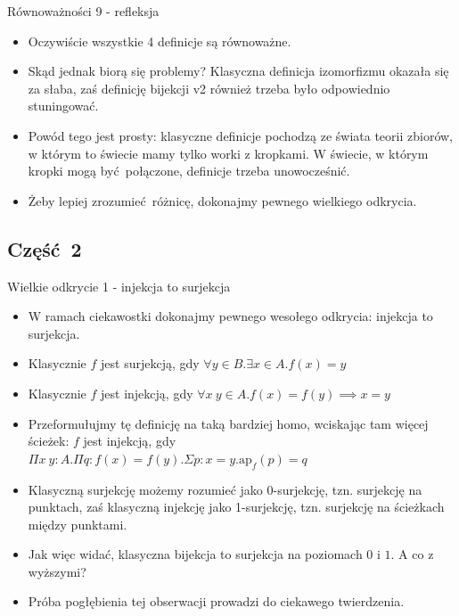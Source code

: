 \documentclass{beamer}
\newcommand{\ap}[2]{\text{ap}_{#1}(#2)}
\begin{document}
\begin{frame}{Równoważności 9 - refleksja}
\begin{itemize}
	\item Oczywiście wszystkie 4 definicje są równoważne.
	\item Skąd jednak biorą się problemy? Klasyczna definicja izomorfizmu okazała się za słaba, zaś definicję bijekcji v2 również trzeba było odpowiednio stuningować.
	\item Powód tego jest prosty: klasyczne definicje pochodzą ze świata teorii zbiorów, w którym to świecie mamy tylko worki z kropkami. W świecie, w którym kropki mogą być połączone, definicje trzeba unowocześnić.
	\item Żeby lepiej zrozumieć różnicę, dokonajmy pewnego wielkiego odkrycia.
\end{itemize}
\end{frame}

\subsection{Część 2}

\begin{frame}{Wielkie odkrycie 1 - injekcja to surjekcja}
\begin{itemize}
	\item W ramach ciekawostki dokonajmy pewnego wesołego odkrycia: injekcja to surjekcja.
	\item Klasycznie $f$ jest surjekcją, gdy $\forall y \in B. \exists x \in A. f(x) = y$
	\item Klasycznie $f$ jest injekcją, gdy $\forall x\ y \in A. f(x) = f(y) \implies x = y$
	\item Przeformułujmy tę definicję na taką bardziej homo, wciskając tam więcej ścieżek: $f$ jest injekcją, gdy $\Pi x\ y : A. \Pi q : f(x) = f(y). \Sigma p : x = y. \ap{f}{p} = q$
	\item Klasyczną surjekcję możemy rozumieć jako 0-surjekcję, tzn. surjekcję na punktach, zaś klasyczną injekcję jako 1-surjekcję, tzn. surjekcję na ścieżkach między punktami.
	\item Jak więc widać, klasyczna bijekcja to surjekcja na poziomach $0$ i $1$. A co z wyższymi?
	\item Próba pogłębienia tej obserwacji prowadzi do ciekawego twierdzenia.
\end{itemize}
\end{frame}
\end{document}
